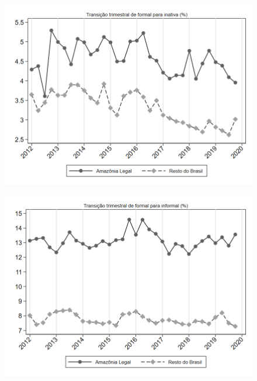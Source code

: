 \begin{frame}[label=_transicao_ocupacao_sh_formal_sh_inativa]{}
\textit{\hyperlink{_transicao_ocupacao}{}}
\begin{figure}
  \centering
  \includegraphics[width=1.0\linewidth]{../../analysis/output/transicao_ocupacao/_transicao_ocupacao_sh_formal_sh_inativa.png}
  \caption{}
  \label{fig:_transicao_ocupacao_sh_formal_sh_inativa}
\end{figure}
\end{frame}

\begin{frame}[label=_transicao_ocupacao_sh_formal_sh_informal]{}
\textit{\hyperlink{_transicao_ocupacao}{}}
\begin{figure}
  \centering
  \includegraphics[width=1.0\linewidth]{../../analysis/output/transicao_ocupacao/_transicao_ocupacao_sh_formal_sh_informal.png}
  \caption{}
  \label{fig:_transicao_ocupacao_sh_formal_sh_informal}
\end{figure}
\end{frame}

